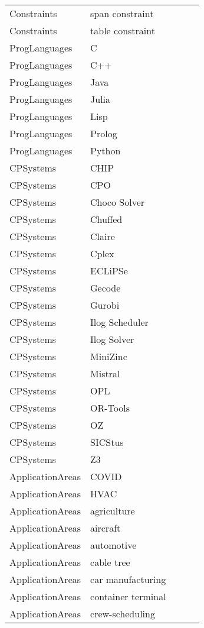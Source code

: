 {\begin{longtable}{lp{3cm}>{\raggedright}p{6cm}>{\raggedright}p{6cm}p{8cm}}
Constraints & span constraint &  &  & \\
Constraints & table constraint &  &  & \\
ProgLanguages & C  &  &  & \\
ProgLanguages & C++ &  &  & \\
ProgLanguages & Java &  &  & \\
ProgLanguages & Julia &  &  & \\
ProgLanguages & Lisp &  &  & \\
ProgLanguages & Prolog &  &  & \\
ProgLanguages & Python &  &  & \\
CPSystems & CHIP &  &  & \\
CPSystems & CPO &  &  & \\
CPSystems & Choco Solver &  &  & \\
CPSystems & Chuffed &  &  & \\
CPSystems & Claire &  &  & \\
CPSystems & Cplex &  &  & \\
CPSystems & ECLiPSe &  &  & \\
CPSystems & Gecode &  &  & \\
CPSystems & Gurobi &  &  & \\
CPSystems & Ilog Scheduler &  &  & \\
CPSystems & Ilog Solver &  &  & \\
CPSystems & MiniZinc &  &  & \\
CPSystems & Mistral &  &  & \\
CPSystems & OPL &  &  & \\
CPSystems & OR-Tools &  &  & \\
CPSystems & OZ &  &  & \\
CPSystems & SICStus &  &  & \\
CPSystems & Z3 &  &  & \\
ApplicationAreas & COVID &  &  & \\
ApplicationAreas & HVAC &  &  & \\
ApplicationAreas & agriculture &  &  & \\
ApplicationAreas & aircraft &  &  & \\
ApplicationAreas & automotive &  &  & \\
ApplicationAreas & cable tree &  &  & \\
ApplicationAreas & car manufacturing &  &  & \\
ApplicationAreas & container terminal &  &  & \\
ApplicationAreas & crew-scheduling &  &  & \\

\end{longtable}}
